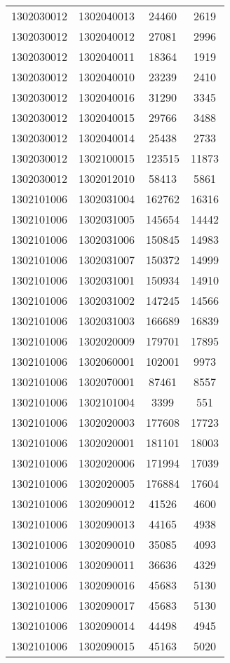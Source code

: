 \begin{longtable}{llcc}
1302030012 & 1302040013 & 24460 & 2619\\
1302030012 & 1302040012 & 27081 & 2996\\
1302030012 & 1302040011 & 18364 & 1919\\
1302030012 & 1302040010 & 23239 & 2410\\
1302030012 & 1302040016 & 31290 & 3345\\
1302030012 & 1302040015 & 29766 & 3488\\
1302030012 & 1302040014 & 25438 & 2733\\
1302030012 & 1302100015 & 123515 & 11873\\
1302030012 & 1302012010 & 58413 & 5861\\
1302101006 & 1302031004 & 162762 & 16316\\
1302101006 & 1302031005 & 145654 & 14442\\
1302101006 & 1302031006 & 150845 & 14983\\
1302101006 & 1302031007 & 150372 & 14999\\
1302101006 & 1302031001 & 150934 & 14910\\
1302101006 & 1302031002 & 147245 & 14566\\
1302101006 & 1302031003 & 166689 & 16839\\
1302101006 & 1302020009 & 179701 & 17895\\
1302101006 & 1302060001 & 102001 & 9973\\
1302101006 & 1302070001 & 87461 & 8557\\
1302101006 & 1302101004 & 3399 & 551\\
1302101006 & 1302020003 & 177608 & 17723\\
1302101006 & 1302020001 & 181101 & 18003\\
1302101006 & 1302020006 & 171994 & 17039\\
1302101006 & 1302020005 & 176884 & 17604\\
1302101006 & 1302090012 & 41526 & 4600\\
1302101006 & 1302090013 & 44165 & 4938\\
1302101006 & 1302090010 & 35085 & 4093\\
1302101006 & 1302090011 & 36636 & 4329\\
1302101006 & 1302090016 & 45683 & 5130\\
1302101006 & 1302090017 & 45683 & 5130\\
1302101006 & 1302090014 & 44498 & 4945\\
1302101006 & 1302090015 & 45163 & 5020\\

\end{longtable}
